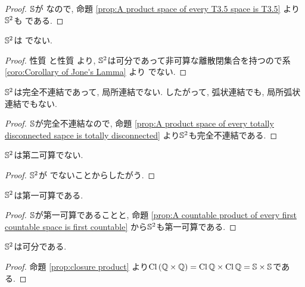 \documentclass[uplatex, dvipdfmx, a4paper, 12pt, class=jsbook, crop=false]{standalone}
\begin{document}
\begin{proof}
	$ \mathbb{S} $が  なので, 命題 \ref{prop:A product space of every T3.5 space is T3.5} より$ \mathbb{S}^2 $も  である.
\end{proof}



\begin{property}
	$ \mathbb{S}^2 $は でない.
\end{property}

\begin{proof}
	性質  と性質  より, $ \mathbb{S}^2 $は可分であって非可算な離散閉集合を持つので系 \ref{coro:Corollary of Jone's Lamma} より  でない.
\end{proof}

\begin{property}
	$ \mathbb{S}^2 $は完全不連結であって, 局所連結でない.	したがって, 弧状連結でも, 局所弧状連結でもない.
\end{property}

\begin{proof}
	$ \mathbb{S} $が完全不連結なので, 命題 \ref{prop:A product space of every totally disconnected sapce is totally disconnected} より$\mathbb{S}^2 $も完全不連結である.
\end{proof}

\begin{property}
	$ \mathbb{S}^2 $は第二可算でない.
\end{property}

\begin{proof}
	$ \mathbb{S}^2 $が \Lindelof でないことからしたがう.
\end{proof}

\begin{property}
	$ \mathbb{S}^2 $は第一可算である.
\end{property}

\begin{proof}
	$ \mathbb{S} $が第一可算であることと, 命題 \ref{prop:A countable product of every first countable space is first countable} から$ \mathbb{S}^2 $も第一可算である.
\end{proof}


\begin{property}
	$ \mathbb{S}^2 $は可分である.
\end{property}

\begin{proof}
	命題 \ref{prop:closure product} より$ \mathop{\mathrm{Cl}}\nolimits{(\mathbb{Q}\times \mathbb{Q})} = \mathop{\mathrm{Cl}}\nolimits{\mathbb{Q}} \times \mathop{\mathrm{Cl}}\nolimits{\mathbb{Q}} = \mathbb{S} \times \mathbb{S} $である.
\end{proof}
\end{document}
